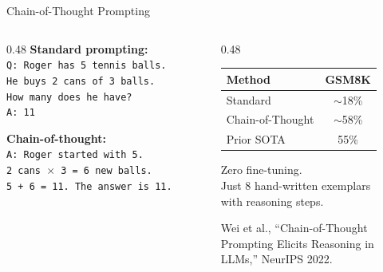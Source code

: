 \documentclass[aspectratio=169, 12pt]{beamer}
\begin{document}
\begin{frame}{Chain-of-Thought Prompting}
  \begin{columns}[T]
    \begin{column}{0.48\textwidth}
      \textbf{Standard prompting:}\\[0.3em]
      {\small\texttt{Q: Roger has 5 tennis balls.}\\
      \texttt{He buys 2 cans of 3 balls.}\\
      \texttt{How many does he have?}\\[0.3em]
      \texttt{A: 11}}

      \vspace{0.8em}
      \textbf{Chain-of-thought:}\\[0.3em]
      {\small\texttt{A: Roger started with 5.}\\
      \texttt{2 cans $\times$ 3 = 6 new balls.}\\
      \texttt{5 + 6 = \alert{11}. The answer is 11.}}
    \end{column}
    \begin{column}{0.48\textwidth}
      \begin{tabular}{lc}
        \toprule
        \textbf{Method} & \textbf{GSM8K} \\
        \midrule
        Standard & ${\sim}$18\% \\
        Chain-of-Thought & ${\sim}$\alert{58\%} \\
        Prior SOTA & 55\% \\
        \bottomrule
      \end{tabular}
      \vspace{0.8em}

      {\small Zero fine-tuning.\\
      Just 8 hand-written exemplars\\
      with reasoning steps.}
      \vspace{0.5em}

      {\scriptsize Wei et al., ``Chain-of-Thought\\
      Prompting Elicits Reasoning in\\
      LLMs,'' NeurIPS 2022.}
    \end{column}
  \end{columns}
\end{frame}
\end{document}
